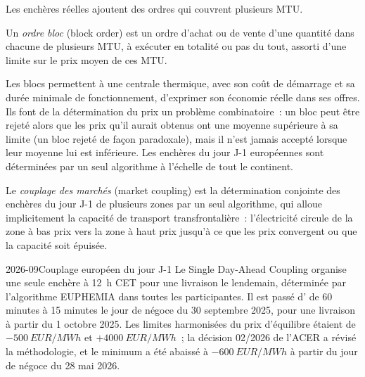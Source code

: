 Les enchères réelles ajoutent des ordres qui couvrent plusieurs MTU.

\begin{definition}\label{def:m3:power-markets-design:block}
Un \emph{ordre bloc} (block order) est un ordre d'achat ou de vente d'une quantité dans chacune de
plusieurs MTU, à exécuter en totalité ou pas du tout, assorti d'une limite sur le prix moyen de ces MTU.
\end{definition}

Les blocs permettent à une centrale thermique, avec son coût de démarrage et sa durée minimale de fonctionnement,
d'exprimer son économie réelle dans ses offres. Ils font de la détermination du prix un problème combinatoire~:
un bloc peut être rejeté alors que les prix qu'il aurait obtenus ont une moyenne supérieure à sa limite (un bloc rejeté de
façon paradoxale), mais il n'est jamais accepté lorsque leur moyenne lui est inférieure. Les enchères du jour J-1
européennes sont déterminées par un seul algorithme à l'échelle de tout le continent.

\begin{definition}\label{def:m3:power-markets-design:coupling}
Le \emph{couplage des marchés} (market coupling) est la détermination conjointe des
enchères du jour J-1 de plusieurs zones par un seul algorithme, qui alloue implicitement la capacité
de transport transfrontalière~: l'électricité circule de la zone à bas prix vers la zone
à haut prix jusqu'à ce que les prix convergent ou que la capacité soit épuisée.
\end{definition}

\begin{dated}{2026-09}{Couplage européen du jour J-1}\label{dat:m3:power-markets-design:sdac}
Le Single Day-Ahead Coupling organise une seule enchère à 12~h CET pour une livraison le lendemain,
déterminée par l'algorithme EUPHEMIA dans toutes les  participantes. Il est passé
d' de 60 minutes à 15 minutes le jour de négoce du 30 septembre 2025, pour une livraison
à partir du 1 octobre 2025. Les limites harmonisées du prix d'équilibre étaient de $-\qty{500}{EUR/MWh}$ et
$+\qty{4000}{EUR/MWh}$~; la décision 02/2026 de l'ACER a révisé la méthodologie, et le minimum
a été abaissé à $-\qty{600}{EUR/MWh}$ à partir du jour de négoce du 28 mai 2026.
\end{dated}

